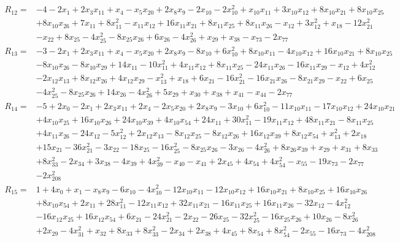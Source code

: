 \begin{align*}
 R_{12}={}&-4 -2x_{1} +2x_{3}x_{11} +x_{4} -x_{5}x_{20} +2x_{8}x_{9} -2x_{10} -2x_{10}^{2} +x_{10}x_{11} +3x_{10}x_{12} +8x_{10}x_{21} +8x_{10}x_{25}\\
 &+8x_{10}x_{26} +7x_{11} +8x_{11}^{2} -x_{11}x_{12} +16x_{11}x_{21} +8x_{11}x_{25} +8x_{11}x_{26} -x_{12} +3x_{12}^{2} +x_{18} -12x_{21}^{2}\\
 &-x_{22} +8x_{25} -4x_{25}^{2} -8x_{25}x_{26} +6x_{26} -4x_{26}^{2} +x_{29} +x_{38} -x_{73} -2x_{77}
\end{align*}
\begin{align*}
 R_{13}={}&-3 -2x_{1} +2x_{3}x_{11} +x_{4} -x_{5}x_{20} +2x_{8}x_{9} -8x_{10} +6x_{10}^{2} +8x_{10}x_{11} -4x_{10}x_{12} +16x_{10}x_{21} +8x_{10}x_{25}\\
 &-8x_{10}x_{26} -8x_{10}x_{29} +14x_{11} -10x_{11}^{2} +4x_{11}x_{12} +8x_{11}x_{25} -24x_{11}x_{26} -16x_{11}x_{29} -x_{12} +4x_{12}^{2}\\
 &-2x_{12}x_{13} +8x_{12}x_{26} +4x_{12}x_{29} -x_{13}^{2} +x_{18} +6x_{21} -16x_{21}^{2} -16x_{21}x_{26} -8x_{21}x_{29} -x_{22} +6x_{25}\\
 &-4x_{25}^{2} -8x_{25}x_{26} +14x_{26} -4x_{26}^{2} +5x_{29} +x_{30} +x_{38} +x_{41} -x_{44} -2x_{77}
\end{align*}
\begin{align*}
 R_{14}={}&-5 +2x_{0} -2x_{1} +2x_{3}x_{11} +2x_{4} -2x_{5}x_{20} +2x_{8}x_{9} -3x_{10} +6x_{10}^{2} -11x_{10}x_{11} -17x_{10}x_{12} +24x_{10}x_{21}\\
 &+4x_{10}x_{25} +16x_{10}x_{26} +24x_{10}x_{39} +4x_{10}x_{54} +24x_{11} +30x_{11}^{2} -19x_{11}x_{12} +48x_{11}x_{21} -8x_{11}x_{25}\\
 &+4x_{11}x_{26} -24x_{12} -5x_{12}^{2} +2x_{12}x_{13} -8x_{12}x_{25} -8x_{12}x_{26} +16x_{12}x_{39} +8x_{12}x_{54} +x_{13}^{2} +2x_{18}\\
 &+15x_{21} -36x_{21}^{2} -3x_{22} -18x_{25} -16x_{25}^{2} -8x_{25}x_{26} -3x_{26} -4x_{26}^{2} +8x_{26}x_{39} +x_{29} +x_{31} +8x_{33}\\
 &+8x_{33}^{2} -2x_{34} +3x_{38} -4x_{39} +4x_{39}^{2} -x_{40} -x_{41} +2x_{45} +4x_{54} +4x_{54}^{2} -x_{55} -19x_{73} -2x_{77}\\
 &-2x_{208}^{2}
\end{align*}
\begin{align*}
 R_{15}={}&1 +4x_{0} +x_{1} -x_{8}x_{9} -6x_{10} -4x_{10}^{2} -12x_{10}x_{11} -12x_{10}x_{12} +16x_{10}x_{21} +8x_{10}x_{25} +16x_{10}x_{26}\\
 &+8x_{10}x_{54} +2x_{11} +28x_{11}^{2} -12x_{11}x_{12} +32x_{11}x_{21} -16x_{11}x_{25} +16x_{11}x_{26} -32x_{12} -4x_{12}^{2}\\
 &-16x_{12}x_{25} +16x_{12}x_{54} +6x_{21} -24x_{21}^{2} -2x_{22} -26x_{25} -32x_{25}^{2} -16x_{25}x_{26} +10x_{26} -8x_{26}^{2}\\
 &+2x_{29} -4x_{31}^{2} +x_{32} +8x_{33} +8x_{33}^{2} -2x_{34} +2x_{38} +4x_{45} +8x_{54} +8x_{54}^{2} -2x_{55} -16x_{73} -4x_{208}^{2}
\end{align*}
